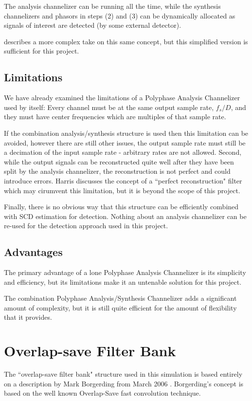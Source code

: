 \documentclass[12pt]{report}
\begin{document}
The analysis channelizer can be running all the time, while the synthesis
channelizers and phasors in steps (2) and (3) can be dynamically allocated as
signals of interest are detected (by some external detector).

\cite{Harris2} describes a more complex take on this same concept, but this
simplified version is sufficient for this project.



\subsection{Limitations}
\label{sec:poly_limitations}
We have already examined the limitations of a Polyphase Analysis
Channelizer used by itself: Every channel must be at the same output sample
rate, $f_s/D$, and they must have center frequencies which are multiples of
that sample rate.

If the combination analysis/synthesis structure is used then this limitation
can be avoided, however there are still other issues, the output sample
rate must still be a decimation of the input sample rate - arbitrary rates are
not allowed. Second, while the output signals can be reconstructed quite well
after they have been split by the analysis channelizer, the reconstruction is
not perfect and could introduce errors. Harris discusses the concept of
a ``perfect reconstruction" filter \cite{Harris2} which may cirumvent this
limitation, but it is beyond the scope of this project.

Finally, there is no obvious way that this structure can be efficiently
combined with SCD estimation for detection. Nothing about an analysis
channelizer can be re-used for the detection approach used in this project.

\subsection{Advantages}
\label{sec:poly_advantages}
The primary advantage of a lone Polyphase Analysis Channelizer is its simplicity and efficiency, but its limitations make it an untenable solution for this project.

The combination Polyphase Analysis/Synthesis Channelizer adds a significant
amount of complexity, but it is still quite efficient for the amount of
flexibility that it provides.


\section{Overlap-save Filter Bank}
\label{sec:os_filter_bank}
The ``overlap-save filter bank" structure used in this simulation is based
entirely on a description by Mark Borgerding from March 2006
\cite{Borgerding1}.  Borgerding's concept is based on the well known
Overlap-Save fast convolution technique.
\end{document}
